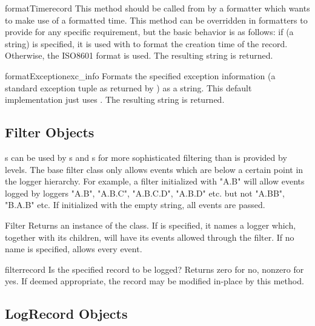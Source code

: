\begin{methoddesc}{formatTime}{record}
This method should be called from  by a formatter which
wants to make use of a formatted time. This method can be overridden
in formatters to provide for any specific requirement, but the
basic behavior is as follows: if  (a string) is specified,
it is used with  to format the creation time of the
record. Otherwise, the ISO8601 format is used. The resulting
string is returned.
\end{methoddesc}

\begin{methoddesc}{formatException}{exc_info}
Formats the specified exception information (a standard exception tuple
as returned by ) as a string. This default
implementation just uses .
The resulting string is returned.
\end{methoddesc}

\subsection{Filter Objects}

s can be used by s and s for
more sophisticated filtering than is provided by levels. The base filter
class only allows events which are below a certain point in the logger
hierarchy. For example, a filter initialized with "A.B" will allow events
logged by loggers "A.B", "A.B.C", "A.B.C.D", "A.B.D" etc. but not "A.BB",
"B.A.B" etc. If initialized with the empty string, all events are passed.

\begin{classdesc}{Filter}{}
Returns an instance of the  class. If  is specified,
it names a logger which, together with its children, will have its events
allowed through the filter. If no name is specified, allows every event.
\end{classdesc}

\begin{methoddesc}{filter}{record}
Is the specified record to be logged? Returns zero for no, nonzero for
yes. If deemed appropriate, the record may be modified in-place by this
method.
\end{methoddesc}

\subsection{LogRecord Objects}

